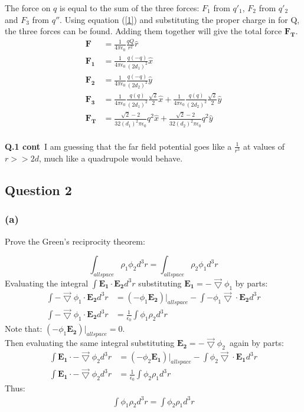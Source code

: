 \documentclass[a4paper,12pt]{article}
\begin{document}
The force on $q$ is equal to the sum of the three forces:
$F_1$ from $q'_1$, $F_2$ from $q'_2$ and $F_3$
from $q''$.  Using equation (\ref{1}) and substituting the proper
charge in for Q, the three forces can be found.  Adding them together
will give the total force $\mathbf{F_T}$.
\begin{align}
\mathbf{F}&=\frac{1}{4\pi\epsilon_0}\frac{qQ}{r^2}\hat{r}\label{1}\\
\mathbf{F_1}&=\frac{1}{4\pi\epsilon_0}\frac{q(-q)}{(2d_1)^2}\hat{x}\\
\mathbf{F_2}&=\frac{1}{4\pi\epsilon_0}\frac{q(-q)}{(2d_2)^2}\hat{y}\\
\mathbf{F_3}&=\frac{1}{4\pi\epsilon_0}\frac{q(q)}{(2d_1)^2}\frac{\sqrt{2}}{2}\hat{x}+\frac{1}{4\pi\epsilon_0}\frac{q(q)}{(2d_2)^2}\frac{\sqrt{2}}{2}\hat{y}\\
\mathbf{F_T}&=\frac{\sqrt{2}-2}{32(d_1)^2\pi\epsilon_0}q^2\hat{x}+\frac{\sqrt{2}-2}{32(d_2)^2\pi\epsilon_0}q^2\hat{y}
\end{align}
\\
\textbf{Q.1 cont}\ I am guessing that the far field potential goes like a
$\frac{1}{r^3}$ at values of $r>>2d$, much like a quadrupole would behave.


\subsection*{Question 2}
\subsubsection*{(a)}
Prove the Green's reciprocity theorem:

\[
\int_{allspace}\rho_1\phi_2d^3r=\int_{allspace}\rho_2\phi_1d^3r
\]
Evaluating the integral $\int\mathbf{E_1}\cdot\mathbf{E_2}d^3r$
substituting $\mathbf{E_1}=-\vec\bigtriangledown\phi_1$ by parts:
\begin{align}
\int
-\vec\bigtriangledown\phi_1\cdot\mathbf{E_2}d^3r&=(-\phi_1\mathbf{E_2})\big|_{allspace}-\int-\phi_1\vec\bigtriangledown\cdot\mathbf{E_2}d^3r\\
\int
-\vec\bigtriangledown\phi_1\cdot\mathbf{E_2}d^3r&=
\frac{1}{\epsilon_0}\int\phi_1\rho_2d^3r
\end{align}Note that: $(-\phi_1\mathbf{E_2})\big|_{allspace}=0$.\\
Then evaluating the same integral substituting
$\mathbf{E_2}=-\vec\bigtriangledown\phi_2$\ again by parts:
\begin{align}
\int\mathbf{E_1}\cdot-\vec\bigtriangledown\phi_2d^3r&=(-\phi_2\mathbf{E_1})\big|_{allspace}-\int\phi_2\vec\bigtriangledown\cdot\mathbf{E_1}d^3r\\
\int\mathbf{E_1}\cdot-\vec\bigtriangledown\phi_2d^3r&=\frac{1}{\epsilon_0}\int\phi_2\rho_1d^3r
\end{align}
Thus:
\begin{align}
 \int\phi_1\rho_2d^3r=\int\phi_2\rho_1d^3r
\end{align}
\end{document}
